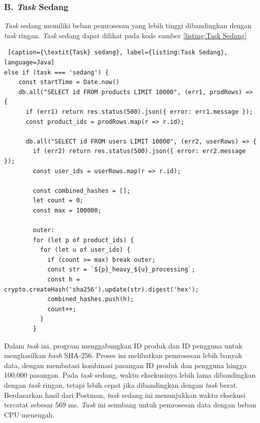 \subsubsection{B. \textit{Task} Sedang}
\textit{Task} sedang memiliki beban pemrosesan yang lebih tinggi dibandingkan dengan \textit{task} ringan. \textit{Task} sedang dapat dilihat pada kode sumber \ref{listing:Task Sedang}

\begin{lstlisting} [caption={\textit{Task} sedang}, label={listing:Task Sedang}, language=Java]
else if (task === 'sedang') {
    const startTime = Date.now()
    db.all("SELECT id FROM products LIMIT 10000", (err1, prodRows) => {
      if (err1) return res.status(500).json({ error: err1.message });
      const product_ids = prodRows.map(r => r.id);

      db.all("SELECT id FROM users LIMIT 10000", (err2, userRows) => {
        if (err2) return res.status(500).json({ error: err2.message });
        const user_ids = userRows.map(r => r.id);

        const combined_hashes = [];
        let count = 0;
        const max = 100000;

        outer:
        for (let p of product_ids) {
          for (let u of user_ids) {
            if (count >= max) break outer;
            const str = `${p}_heavy_${u}_processing`;
            const h = crypto.createHash('sha256').update(str).digest('hex');
            combined_hashes.push(h);
            count++;
          }
        }
\end{lstlisting}

Dalam \textit{task} ini, program menggabungkan ID produk dan ID pengguna untuk menghasilkan \textit{hash} SHA-256. Proses ini melibatkan pemrosesan lebih banyak data, dengan membatasi kombinasi pasangan ID produk dan pengguna hingga 100.000 pasangan. Pada \textit{task} sedang, waktu eksekusinya lebih lama dibandingkan dengan \textit{task} ringan, tetapi lebih cepat jika dibandingkan dengan \textit{task} berat. Berdasarkan hasil dari Postman, \textit{task} sedang ini menunjukkan waktu eksekusi tercatat sebesar 569 ms. \textit{Task} ini seimbang untuk pemrosesan data dengan beban CPU menengah.

